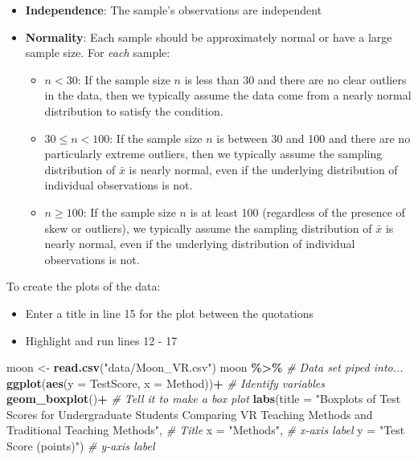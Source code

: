 \documentclass[
]{report}
\newenvironment{Shaded}{\begin{snugshade}}{\end{snugshade}}
\newcommand{\AttributeTok}[1]{\textcolor[rgb]{0.13,0.29,0.53}{#1}}
\newcommand{\CommentTok}[1]{\textcolor[rgb]{0.56,0.35,0.01}{\textit{#1}}}
\newcommand{\FunctionTok}[1]{\textcolor[rgb]{0.13,0.29,0.53}{\textbf{#1}}}
\newcommand{\NormalTok}[1]{#1}
\newcommand{\OtherTok}[1]{\textcolor[rgb]{0.56,0.35,0.01}{#1}}
\newcommand{\SpecialCharTok}[1]{\textcolor[rgb]{0.81,0.36,0.00}{\textbf{#1}}}
\newcommand{\StringTok}[1]{\textcolor[rgb]{0.31,0.60,0.02}{#1}}
\begin{document}
\begin{itemize}
\item
  \textbf{Independence}: The sample's observations are independent
\item
  \textbf{Normality}: Each sample should be approximately normal or have a large sample size. For \emph{each} sample:

  \begin{itemize}
  \item
    \(n < 30\): If the sample size \(n\) is less than 30 and there are no clear outliers in the data, then we typically assume the data come from a nearly normal distribution to satisfy the condition.
  \item
    \(30 \le n < 100\): If the sample size \(n\) is between 30 and 100 and there are no particularly extreme outliers, then we typically assume the sampling distribution of \(\bar{x}\) is nearly normal, even if the underlying distribution of individual observations is not.
  \item
    \(n \geq 100\): If the sample size \(n\) is at least 100 (regardless of the presence of skew or outliers), we typically assume the sampling distribution of \(\bar{x}\) is nearly normal, even if the underlying distribution of individual observations is not.
  \end{itemize}
\end{itemize}

To create the plots of the data:

\begin{itemize}
\item
  Enter a title in line 15 for the plot between the quotations
\item
  Highlight and run lines 12 - 17
\end{itemize}

\begin{Shaded}
\begin{Highlighting}[]
\NormalTok{moon }\OtherTok{\textless{}{-}} \FunctionTok{read.csv}\NormalTok{(}\StringTok{"data/Moon\_VR.csv"}\NormalTok{)}
\NormalTok{moon }\SpecialCharTok{\%\textgreater{}\%}  \CommentTok{\# Data set piped into...}
  \FunctionTok{ggplot}\NormalTok{(}\FunctionTok{aes}\NormalTok{(}\AttributeTok{y =}\NormalTok{ TestScore, }\AttributeTok{x =}\NormalTok{ Method))}\SpecialCharTok{+}  \CommentTok{\# Identify variables}
  \FunctionTok{geom\_boxplot}\NormalTok{()}\SpecialCharTok{+}  \CommentTok{\# Tell it to make a box plot}
  \FunctionTok{labs}\NormalTok{(}\AttributeTok{title =} \StringTok{"Boxplots of Test Scores for Undergraduate Students Comparing VR }
\StringTok{       Teaching Methods and Traditional Teaching Methods"}\NormalTok{,  }\CommentTok{\# Title}
       \AttributeTok{x =} \StringTok{"Methods"}\NormalTok{,    }\CommentTok{\# x{-}axis label}
       \AttributeTok{y =} \StringTok{"Test Score (points)"}\NormalTok{)  }\CommentTok{\# y{-}axis label}
\end{Highlighting}
\end{Shaded}
\end{document}
